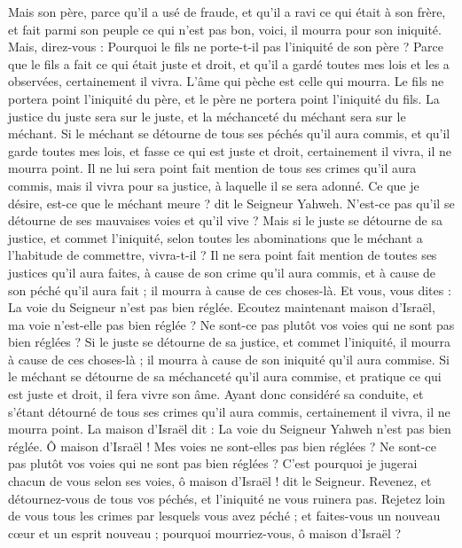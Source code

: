 \begin{multicols}{2}
Mais son père, parce qu'il a usé de fraude, et qu'il a ravi ce qui était à son frère, et fait parmi son peuple ce qui n'est pas bon, voici, il mourra pour son iniquité.
Mais, direz-vous : Pourquoi le fils ne porte-t-il pas l'iniquité de son père ? Parce que le fils a fait ce qui était juste et droit, et qu'il a gardé toutes mes lois et les a observées, certainement il vivra.
L'âme qui pèche est celle qui mourra. Le fils ne portera point l'iniquité du père, et le père ne portera point l'iniquité du fils. La justice du juste sera sur le juste, et la méchanceté du méchant sera sur le méchant.
Si le méchant se détourne de tous ses péchés qu'il aura commis, et qu'il garde toutes mes lois, et fasse ce qui est juste et droit, certainement il vivra, il ne mourra point.
Il ne lui sera point fait mention de tous ses crimes qu'il aura commis, mais il vivra pour sa justice, à laquelle il se sera adonné.
Ce que je désire, est-ce que le méchant meure ? dit le Seigneur Yahweh. N'est-ce pas qu'il se détourne de ses mauvaises voies et qu'il vive ?
Mais si le juste se détourne de sa justice, et commet l'iniquité, selon toutes les abominations que le méchant a l'habitude de commettre, vivra-t-il ? Il ne sera point fait mention de toutes ses justices qu'il aura faites, à cause de son crime qu'il aura commis, et à cause de son péché qu'il aura fait ; il mourra à cause de ces choses-là.
Et vous, vous dites : La voie du Seigneur n'est pas bien réglée. Ecoutez maintenant maison d'Israël, ma voie n'est-elle pas bien réglée ? Ne sont-ce pas plutôt vos voies qui ne sont pas bien réglées ?
Si le juste se détourne de sa justice, et commet l'iniquité, il mourra à cause de ces choses-là ; il mourra à cause de son iniquité qu'il aura commise.
Si le méchant se détourne de sa méchanceté qu'il aura commise, et pratique ce qui est juste et droit, il fera vivre son âme.
Ayant donc considéré sa conduite, et s'étant détourné de tous ses crimes qu'il aura commis, certainement il vivra, il ne mourra point.
La maison d'Israël dit : La voie du Seigneur Yahweh n'est pas bien réglée. Ô maison d'Israël ! Mes voies ne sont-elles pas bien réglées ? Ne sont-ce pas plutôt vos voies qui ne sont pas bien réglées ?
C'est pourquoi je jugerai chacun de vous selon ses voies, ô maison d'Israël ! dit le Seigneur. Revenez, et détournez-vous de tous vos péchés, et l'iniquité ne vous ruinera pas.
Rejetez loin de vous tous les crimes par lesquels vous avez péché ; et faites-vous un nouveau cœur et un esprit nouveau ; pourquoi mourriez-vous, ô maison d'Israël ?

\end{multicols}
